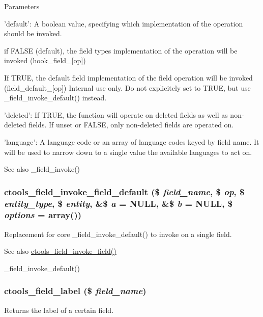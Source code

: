 \begin{DoxyParams}{Parameters}
\begin{DoxyItemize}
\item 'default': A boolean value, specifying which implementation of the operation should be invoked.
\begin{DoxyItemize}
\item if FALSE (default), the field types implementation of the operation will be invoked (hook\_\-field\_\-\mbox{[}op\mbox{]})
\item If TRUE, the default field implementation of the field operation will be invoked (field\_\-default\_\-\mbox{[}op\mbox{]}) Internal use only. Do not explicitely set to TRUE, but use \_\-field\_\-invoke\_\-default() instead.
\end{DoxyItemize}
\item 'deleted': If TRUE, the function will operate on deleted fields as well as non-\/deleted fields. If unset or FALSE, only non-\/deleted fields are operated on.
\item 'language': A language code or an array of language codes keyed by field name. It will be used to narrow down to a single value the available languages to act on.
\end{DoxyItemize}\end{DoxyParams}
\begin{DoxySeeAlso}{See also}
\_\-field\_\-invoke() 
\end{DoxySeeAlso}
\hypertarget{fields_8inc_a0c7f122d4f06bf0276adccf59a47d6f4}{
\subsubsection[{ctools\_\-field\_\-invoke\_\-field\_\-default}]{\setlength{\rightskip}{0pt plus 5cm}ctools\_\-field\_\-invoke\_\-field\_\-default (\$ {\em field\_\-name}, \/  \$ {\em op}, \/  \$ {\em entity\_\-type}, \/  \$ {\em entity}, \/  \&\$ {\em a} = {\ttfamily NULL}, \/  \&\$ {\em b} = {\ttfamily NULL}, \/  \$ {\em options} = {\ttfamily array()})}}
\label{fields_8inc_a0c7f122d4f06bf0276adccf59a47d6f4}
Replacement for core \_\-field\_\-invoke\_\-default() to invoke on a single field.

\begin{DoxySeeAlso}{See also}
\hyperlink{fields_8inc_a109d8f80825dc8d999859e0d580ca8e5}{ctools\_\-field\_\-invoke\_\-field()} 

\_\-field\_\-invoke\_\-default() 
\end{DoxySeeAlso}
\hypertarget{fields_8inc_a56fdb1540ed0662e97789fc89cec1365}{
\subsubsection[{ctools\_\-field\_\-label}]{\setlength{\rightskip}{0pt plus 5cm}ctools\_\-field\_\-label (\$ {\em field\_\-name})}}
\label{fields_8inc_a56fdb1540ed0662e97789fc89cec1365}
Returns the label of a certain field.

